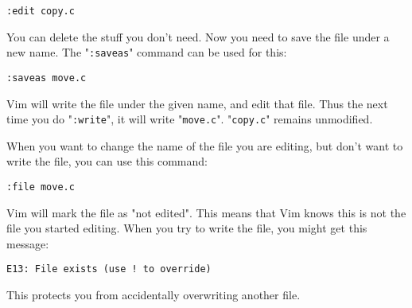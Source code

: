  \begin{Verbatim}[samepage=true]
 :edit copy.c
 \end{Verbatim}

You can delete the stuff you don't need.
Now you need to save the file under a new name.
The "\texttt{:saveas}" command can be used for this:

 \begin{Verbatim}[samepage=true]
 :saveas move.c
 \end{Verbatim}

Vim will write the file under the given name, and edit that file.
Thus the next time you do "\texttt{:write}", it will write "\texttt{move.c}".
"\texttt{copy.c}" remains unmodified.

When you want to change the name of the file you are editing, but don't want to write the file, you can use this command:

 \begin{Verbatim}[samepage=true]
 :file move.c
 \end{Verbatim}

Vim will mark the file as "not edited".
This means that Vim knows this is not the file you started editing.
When you try to write the file, you might get this message:

\begin{Verbatim}[samepage=true]
    E13: File exists (use ! to override) 
\end{Verbatim}

This protects you from accidentally overwriting another file.
\clearpage
